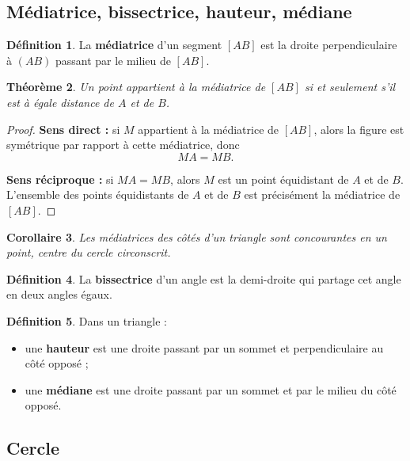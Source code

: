 \documentclass[11pt,a4paper]{article}
\theoremstyle{definition}
\newtheorem{definition}{Définition}[section]
\theoremstyle{plain}
\newtheorem{theoreme}[definition]{Théorème}
\newtheorem{corollaire}[definition]{Corollaire}
\begin{document}
\subsection{Médiatrice, bissectrice, hauteur, médiane}

\begin{definition}
La \textbf{médiatrice} d'un segment $[AB]$ est la droite perpendiculaire à $(AB)$ passant par le milieu de $[AB]$.
\end{definition}

\begin{theoreme}
Un point appartient à la médiatrice de $[AB]$ si et seulement s'il est à égale distance de $A$ et de $B$.
\end{theoreme}

\begin{proof}
\textbf{Sens direct :} si $M$ appartient à la médiatrice de $[AB]$, alors la figure est symétrique par rapport à cette médiatrice, donc
\[
MA=MB.
\]

\textbf{Sens réciproque :} si $MA=MB$, alors $M$ est un point équidistant de $A$ et de $B$.
L'ensemble des points équidistants de $A$ et de $B$ est précisément la médiatrice de $[AB]$.
\end{proof}

\begin{corollaire}
Les médiatrices des côtés d'un triangle sont concourantes en un point, centre du cercle circonscrit.
\end{corollaire}

\begin{definition}
La \textbf{bissectrice} d'un angle est la demi-droite qui partage cet angle en deux angles égaux.
\end{definition}

\begin{definition}
Dans un triangle :
\begin{itemize}
    \item une \textbf{hauteur} est une droite passant par un sommet et perpendiculaire au côté opposé ;
    \item une \textbf{médiane} est une droite passant par un sommet et par le milieu du côté opposé.
\end{itemize}
\end{definition}

\subsection{Cercle}
\end{document}
